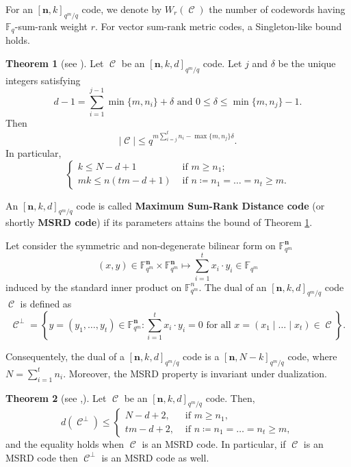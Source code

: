 \documentclass[11pt]{amsart}
\DeclareMathOperator{\C}{\mathcal{C}}
\theoremstyle{definition}
\newtheorem{theorem}{Theorem}[section]
\newcommand{\F}{{\mathbb F}}
\newcommand{\bfn}{\mathbf {n}}
\newcommand{\fq}{{\mathbb F}_{q}}
\newcommand{\Fmnk}{[\bfn,k]_{q^m/q}}
\newcommand{\Fmnkd}{[\bfn,k,d]_{q^m/q}}
\begin{document}
\medskip 
For an $\Fmnk$ code, we denote by $W_r(\C)$ the number of codewords having $\fq$-sum-rank weight $r$. For vector sum-rank metric codes, a Singleton-like bound holds.

\begin{theorem}[see \textnormal{\cite[Theorem III.2]{byrne2021fundamental} \cite[Proposition 16]{Martinez2018skew}}]  \label{th:Singletonbound}
    Let $\C$ be an $[\bfn,k,d]_{q^m/q}$ code. Let $j$ and $\delta$ be the unique integers satisfying \[d-1=\sum_{i=1}^{j-1}\min\{m,n_i\}+\delta \mbox{ and }0 \leq \delta \leq \min\{m,n_j\}-1.\]
Then 
\[
\lvert \C \rvert \leq q^{m\sum_{i=j}^tn_i-\max\{m,n_j\} \delta}.\] 
In particular,
    \[
    \begin{cases}
    k \leq N-d+1 & \mbox{ if } m \geq n_1; \\
    mk \leq n(tm-d+1) & \mbox{ if } n\coloneqq n_1=\ldots=n_t \geq m.
    \end{cases}
    \]
\end{theorem}

An $[\bfn,k,d]_{q^m/q}$ code is called \textbf{Maximum Sum-Rank Distance code} (or shortly \textbf{MSRD code}) if its parameters attains the bound of Theorem \ref{th:Singletonbound}.


\medskip 


Let consider the symmetric and non-degenerate bilinear form on $\F_{q^m}^\bfn$ 
\[(x,y)\in\F_{q^m}^\bfn\times \F_{q^m}^\bfn \mapsto \sum_{i=1}^t x_i \cdot y_i \in \F_{q^m}\] induced by the standard inner product on $\F_{q^m}^n$. 
The dual of an $[\bfn,k,d]_{q^m/q}$ code $\C$ is defined as 
\[
\C^{\perp} =\left\{
y=(y_1 ,\ldots, y_t) \in \F_{q^m}^\bfn \colon \sum_{i=1}^t x_i \cdot y_i=0 \mbox{ for all } x=(x_1 \mid \ldots \mid x_t) \in \C
\right\}.
\]

Consequentely, the dual of a $\Fmnkd$ code is a $[\bfn,N-k]_{q^m/q}$ code, where $N=\sum_{i=1}^t n_i$. Moreover, the MSRD property is invariant under dualization.

\begin{theorem} [see \textnormal{\cite[Theorem 6.1]{byrne2021fundamental},\cite[Theorem 5]{martinez2019theory}}] \label{th:dualMSRD}
Let $\C$ be an $[\bfn,k,d]_{q^m/q}$ code. 
Then, $$d(\C^{\perp})\leq 
     \begin{cases}
     N-d+2, & \mbox{ if } m \geq n_1, \\
     tm-d+2, & \mbox{ if } n\coloneqq n_1=\ldots=n_t \geq m,
     \end{cases}
     $$
    and the equality holds when $\C$ is an MSRD code. In particular, if $\C$ is an MSRD code then $\C^\perp$ is an MSRD code as well.
\end{theorem}
\end{document}

